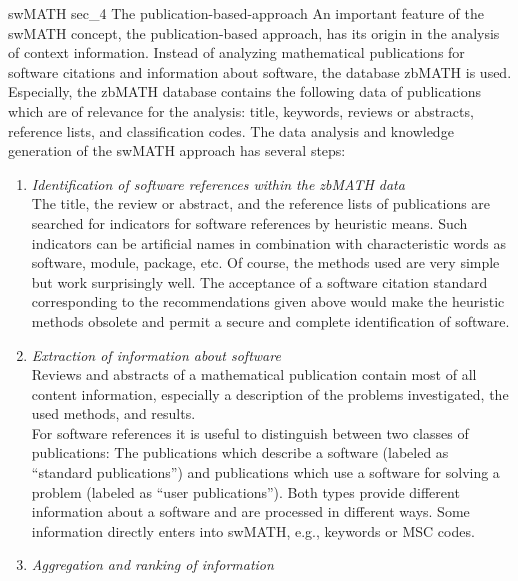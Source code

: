 \documentclass[a4paper,11pt]{article}
\begin{document}
\begin{multicols}{2}
\Ueberschrift
{swMATH}
{sec_4}
\Ueberschriftu
{The publication-based-approach}
An important feature of the swMATH \cite{swMATH} concept, the publication-based approach, has its origin in the analysis of context information. Instead of analyzing  mathematical publications for software citations and information about software, the database zbMATH \cite{zbMATH} is used.  Especially, the zbMATH database contains the following data of publications which are of relevance for the analysis: title, keywords, reviews or abstracts, reference lists, and classification codes.
The data analysis and knowledge generation of the swMATH approach has several steps:
\begin{enumerate}
\item{\textit{Identification of software references within the zbMATH data}}\\
The title, the review or abstract, and the reference lists of publications are searched for indicators for software references by heuristic means. Such indicators can be artificial names in combination with characteristic words as software, module, package, etc.  Of course, the methods used are very simple but work surprisingly well. The acceptance of a software citation standard corresponding to the recommendations given above would make the heuristic methods obsolete and permit a secure and complete identification of software.
\item{\textit{Extraction of information about software}}\\
Reviews and abstracts of a mathematical publication contain most of all content information, especially a description of the problems investigated, the used methods, and results. \\ For software
references it is useful to distinguish between two classes of publications: The publications which describe a software (labeled as  ``standard publications'') and publications which use a software for solving a problem (labeled as ``user publications''). Both types provide different information about a software and are processed in different ways. Some information directly enters into swMATH, e.g., keywords or MSC codes.
\item{\textit{Aggregation and ranking of information}}\\

\end{enumerate}
\end{multicols}
\end{document}
